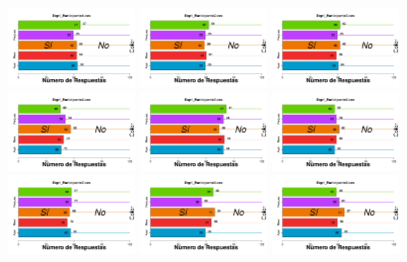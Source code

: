 \begin{figure}[th]
\centering
\includegraphics[width=0.30\textwidth]{Figures/BiasColor_Exp1_P1} \includegraphics[width=0.30\textwidth]{Figures/BiasColor_Exp1_P2} \includegraphics[width=0.30\textwidth]{Figures/BiasColor_Exp1_P3}
\includegraphics[width=0.30\textwidth]{Figures/BiasColor_Exp1_P4} \includegraphics[width=0.30\textwidth]{Figures/BiasColor_Exp1_P5} \includegraphics[width=0.30\textwidth]{Figures/BiasColor_Exp1_P6}
\includegraphics[width=0.30\textwidth]{Figures/BiasColor_Exp1_P7} \includegraphics[width=0.30\textwidth]{Figures/BiasColor_Exp1_P8} \includegraphics[width=0.30\textwidth]{Figures/BiasColor_Exp1_P9}

\end{figure}
